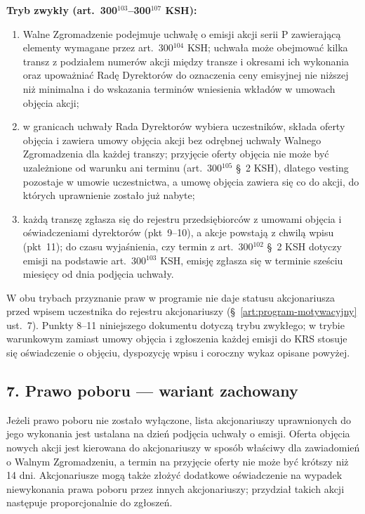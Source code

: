 \documentclass[12pt,a4paper]{report}
\begin{document}
\textbf{Tryb zwykły (art.~300$^{103}$--300$^{107}$ KSH):}
\begin{enumerate}
  \item Walne Zgromadzenie podejmuje uchwałę o emisji akcji serii P zawierającą elementy wymagane przez art.~300$^{104}$ KSH; uchwała może obejmować kilka transz z podziałem numerów akcji między transze i okresami ich wykonania oraz upoważniać Radę Dyrektorów do oznaczenia ceny emisyjnej nie niższej niż minimalna i do wskazania terminów wniesienia wkładów w umowach objęcia akcji;
  \item w granicach uchwały Rada Dyrektorów wybiera uczestników, składa oferty objęcia i zawiera umowy objęcia akcji bez odrębnej uchwały Walnego Zgromadzenia dla każdej transzy; przyjęcie oferty objęcia nie może być uzależnione od warunku ani terminu (art.~300$^{105}$ §~2 KSH), dlatego vesting pozostaje w umowie uczestnictwa, a umowę objęcia zawiera się co do akcji, do których uprawnienie zostało już nabyte;
  \item każdą transzę zgłasza się do rejestru przedsiębiorców z umowami objęcia i oświadczeniami dyrektorów (pkt~9--10), a akcje powstają z chwilą wpisu (pkt~11); do czasu wyjaśnienia, czy termin z art.~300$^{102}$ §~2 KSH dotyczy emisji na podstawie art.~300$^{103}$ KSH, emisję zgłasza się w terminie sześciu miesięcy od dnia podjęcia uchwały.
\end{enumerate}

W obu trybach przyznanie praw w programie nie daje statusu akcjonariusza przed wpisem uczestnika do rejestru akcjonariuszy (§~\ref{art:program-motywacyjny} ust.~7). Punkty 8--11 niniejszego dokumentu dotyczą trybu zwykłego; w trybie warunkowym zamiast umowy objęcia i zgłoszenia każdej emisji do KRS stosuje się oświadczenie o objęciu, dyspozycję wpisu i coroczny wykaz opisane powyżej.

\subsection*{7. Prawo poboru --- wariant zachowany}

Jeżeli prawo poboru nie zostało wyłączone, lista akcjonariuszy uprawnionych do jego wykonania jest ustalana na dzień podjęcia uchwały o emisji. Oferta objęcia nowych akcji jest kierowana do akcjonariuszy w sposób właściwy dla zawiadomień o Walnym Zgromadzeniu, a termin na przyjęcie oferty nie może być krótszy niż 14 dni. Akcjonariusze mogą także złożyć dodatkowe oświadczenie na wypadek niewykonania prawa poboru przez innych akcjonariuszy; przydział takich akcji następuje proporcjonalnie do zgłoszeń.
\end{document}
